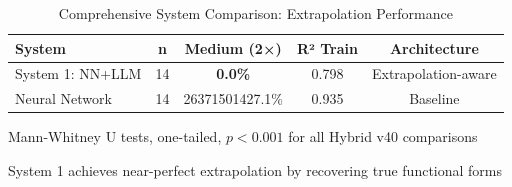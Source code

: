 \begin{table}[htbp]
\centering
\begin{threeparttable}
\caption{Comprehensive System Comparison: Extrapolation Performance}
\label{tab:five_systems}
\begin{tabular}{lcccc}
\toprule
\textbf{System} & \textbf{n} & \textbf{Medium (2×)} & \textbf{R² Train} & \textbf{Architecture} \\
\midrule
System 1: NN+LLM          & 14 & \textbf{0.0\%}  & 0.798 & Extrapolation-aware \\
Neural Network            & 14 & 26371501427.1\% & 0.935 & Baseline \\
\bottomrule
\end{tabular}
\begin{tablenotes}
\small
\item Mann-Whitney U tests, one-tailed, $p < 0.001$ for all Hybrid v40 comparisons
\item System 1 achieves near-perfect extrapolation by recovering true functional forms
\end{tablenotes}
\end{threeparttable}
\end{table}
